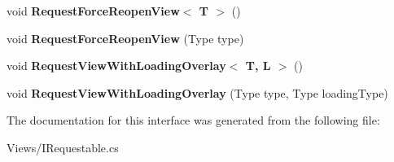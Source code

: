 \begin{DoxyCompactItemize}
\item 
\hypertarget{interface_scaffolding_1_1_i_requestable_a7bd29fd5ec68858da4c8626b93d7fb3a}{void {\bfseries Request\+Force\+Reopen\+View$<$ T $>$} ()}\label{interface_scaffolding_1_1_i_requestable_a7bd29fd5ec68858da4c8626b93d7fb3a}

\item 
\hypertarget{interface_scaffolding_1_1_i_requestable_aea438ab1307dc5ffee48379f6beb17f8}{void {\bfseries Request\+Force\+Reopen\+View} (Type type)}\label{interface_scaffolding_1_1_i_requestable_aea438ab1307dc5ffee48379f6beb17f8}

\item 
\hypertarget{interface_scaffolding_1_1_i_requestable_ab8c48103df46a4ff2ee11832a4e299cc}{void {\bfseries Request\+View\+With\+Loading\+Overlay$<$ T, L $>$} ()}\label{interface_scaffolding_1_1_i_requestable_ab8c48103df46a4ff2ee11832a4e299cc}

\item 
\hypertarget{interface_scaffolding_1_1_i_requestable_a2b9c62403a1938d6fd638b3d300cc834}{void {\bfseries Request\+View\+With\+Loading\+Overlay} (Type type, Type loading\+Type)}\label{interface_scaffolding_1_1_i_requestable_a2b9c62403a1938d6fd638b3d300cc834}

\end{DoxyCompactItemize}


The documentation for this interface was generated from the following file\+:\begin{DoxyCompactItemize}
\item 
Views/I\+Requestable.\+cs\end{DoxyCompactItemize}
